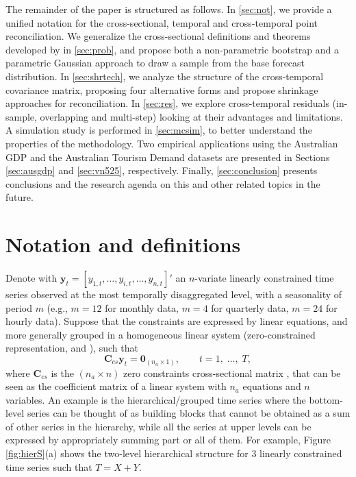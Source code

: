 \documentclass[a4paper,11pt]{article}
\newcommand{\yvet}{\bm{y}}
\newcommand{\Cvet}{\bm{C}}
\newcommand{\Zerovet}{\bm{0}}
\theoremstyle{definition}
\begin{document}
The remainder of the paper is structured as follows.
In \autoref{sec:not}, we provide a unified notation for the cross-sectional, temporal and cross-temporal point reconciliation.
We generalize the cross-sectional definitions and theorems developed by \cite{panagiotelis2023} in \autoref{sec:prob}, and propose both a non-parametric bootstrap and a parametric Gaussian approach to draw a sample from the base forecast distribution.
In \autoref{sec:shrtech}, we analyze the structure of the cross-temporal covariance matrix, proposing four alternative forms and propose shrinkage approaches for reconciliation.
In \autoref{sec:res}, we explore cross-temporal residuals (in-sample, overlapping and multi-step) looking at their advantages and limitations.
A simulation study is performed in \autoref{sec:mcsim}, to better understand the properties of the methodology.
Two empirical applications using the Australian GDP and the Australian Tourism Demand datasets are presented in Sections \ref{sec:ausgdp} and \ref{sec:vn525}, respectively.
Finally, \autoref{sec:conclusion} presents conclusions and the research agenda on this and other related topics in the future.

\section{Notation and definitions}\label{sec:not}


Denote with $\yvet_t = [y_{1,t},\dots,y_{i,t},\dots,y_{n,t}]'$ an $n$-variate linearly constrained time series observed at the most temporally disaggregated level, with a seasonality of period $m$ (e.g., $m = 12$ for monthly data, $m = 4$ for quarterly data, $m = 24$ for hourly data). Suppose that the constraints are expressed by linear equations, and more generally grouped in a homogeneous linear system (zero-constrained representation, \citealp{wickramasuriya2019} and  \citealp{difonzo2023}), such that
\begin{equation}
\label{eq:cs_con}
	\Cvet_{cs}\yvet_t = \Zerovet_{(n_a \times 1)}, \qquad t = 1, \;\dots, \;T,
\end{equation}
where $\Cvet_{cs}$ is the $(n_a \times n)$ zero constraints cross-sectional matrix , that can be seen as the coefficient matrix of a linear system with $n_a$ equations and $n$ variables. An example is the hierarchical/grouped time series where the bottom-level series can be thought of as building blocks that cannot be obtained as a sum of other series in the hierarchy, while all the series at upper levels can be expressed by appropriately summing part or all of them. For example, Figure \ref{fig:hierS}(a) shows the two-level hierarchical structure for 3 linearly constrained time series such that $T = X + Y$.
\end{document}
